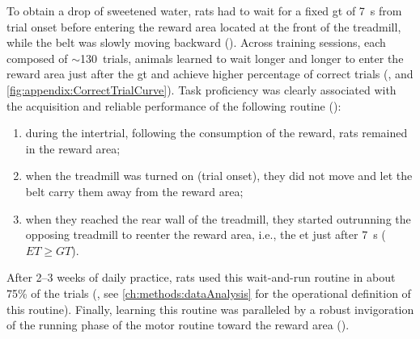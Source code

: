 To obtain a drop of sweetened water, rats had to wait for a fixed \gls{gt} of 7~s from trial onset before entering the reward area located at the front of the treadmill, while the belt was slowly moving backward ().
Across training sessions, each composed of $\sim$130~trials, animals learned to wait longer and longer to enter the reward area just after the \gls{gt} and achieve higher percentage of correct trials (, and \autoref{fig:appendix:CorrectTrialCurve}).
Task proficiency was clearly associated with the acquisition and reliable performance of the following routine ():
\begin{enumerate}[noitemsep, label=\Roman*.]
    \item during the intertrial, following the consumption of the reward, rats remained in the reward area;
    \item when the treadmill was turned on (trial onset), they did not move and let the belt carry them away from the reward area;
    \item when they reached the rear wall of the treadmill, they started outrunning the opposing treadmill to reenter the reward area, i.e., the \gls{et} just after 7~s ($ET\geq GT$).
\end{enumerate}
After 2--3 weeks of daily practice, rats used this wait-and-run routine in about 75\% of the trials (, see \autoref{ch:methods:dataAnalysis} for the operational definition of this routine).
Finally, learning this routine was paralleled by a robust invigoration of the running phase of the motor routine toward the reward area ().


